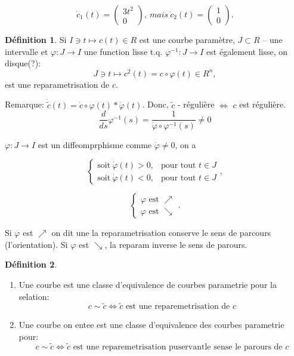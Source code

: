 \documentclass[french]{article}
\theoremstyle{definition}
\newtheorem{definition}{Définition}[section]
\theoremstyle{theorem}
\theoremstyle{proposition}
\theoremstyle{lemme}
\begin{document}
$$ \dot{c}_1(t) = \left( \begin{array}{c} 3t^2 \\ 0 \end{array} \right),\ mais\ \dot{c}_2(t) = \left( \begin{array}{c} 1 \\ 0 \end{array} \right).$$

\begin{definition} Si $I\ni t \mapsto c(t)\in R$ est une courbe paramètre, $J\subset R$ -- une intervalle et $\varphi: J\rightarrow I$ une function lisse t.q. $\varphi^{-1}: J\rightarrow I$ est également lisse, on disque(?):
$$J\ni t \mapsto c^2(t) = c\circ\varphi(t) \in R^n,$$
est une reparametrisation  de  $c$.
\end{definition}

Remarque:  
$\dot{\tilde{c}}(t)=\dot{c}\circ\varphi(t)*\dot{\varphi}(t)$. Donc,
$\tilde{c}$ - régulière $\Longleftrightarrow$ $c$ est régulière.
$$\frac{d}{ds}\varphi^{-1}(s)=\frac{1}{\dot{\varphi}\circ\varphi^{-1}(s)}\neq 0$$

$\varphi: J\rightarrow I$ est un diffeomprphisme comme $\dot{\varphi}\neq0$, on a

$$\left\{\begin{array}{rl}
\mbox{soit}\ \dot{\varphi}(t)>0, & \mbox{pour tout } t\in J \\ 
\mbox{soit}\ \dot{\varphi}(t)<0, & \mbox{pour tout } t\in J 
\end{array}\right.,$$

$$\left\{\begin{array}{rl}
\varphi\mbox{ est } \nearrow \\ 
\varphi\mbox{ est } \searrow
\end{array}\right..$$

Si $\varphi$ est $\nearrow$ on dit une la reparametrisation conserve le sens de parcours (l'orientation).
Si $\varphi$ est $\searrow$, la reparam inverse le sens de parours.

\begin{definition}
\begin{enumerate}
\item Une courbe est une classe d'equivalence de courbes parametrie pour la selation:
$$c\sim \tilde{c}\Longleftrightarrow\tilde{c}\mbox{ est une reparemetrisation de }c$$
\item Une courbe on entee est une classe d'equivalence des courbes parametrie pour:
$$c\sim \tilde{c}\Longleftrightarrow\tilde{c}\mbox{ est une reparemetrisation puservantle sense le parours de }c$$
\end{enumerate}
\end{definition}
\end{document}

